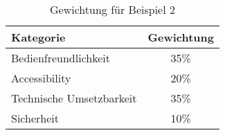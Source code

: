 \begin{table}[h!]
    \caption{Gewichtung für Beispiel 2}
    \begin{center}
        \begin{tabular}{l|c}
            Kategorie                       & Gewichtung \\\hline
            Bedienfreundlichkeit            & 35\%         \\
            Accessibility                   & 20\%        \\
            Technische Umsetzbarkeit        & 35\%         \\
            Sicherheit                      & 10\%         
        \end{tabular}
    \end{center}
\end{table}